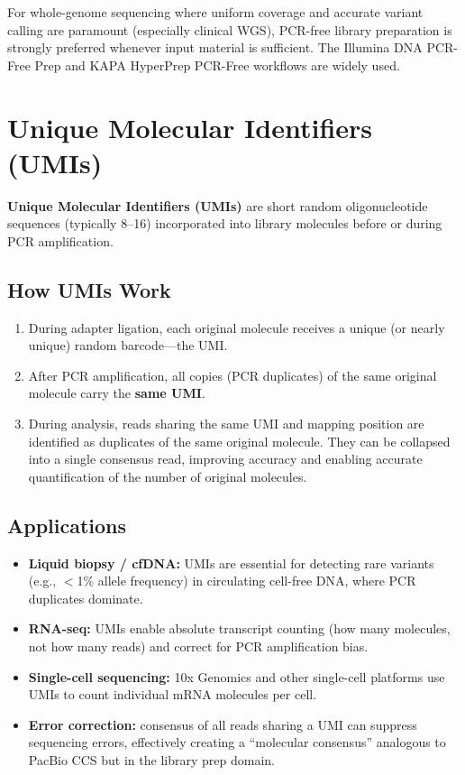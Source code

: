 \begin{tipbox}[title={When to Go PCR-Free}]
For whole-genome sequencing where uniform coverage and accurate variant calling are paramount (especially clinical WGS), PCR-free library preparation is strongly preferred whenever input material is sufficient. The Illumina DNA PCR-Free Prep and KAPA HyperPrep PCR-Free workflows are widely used.
\end{tipbox}


\section{Unique Molecular Identifiers (UMIs)}
\label{sec:umis}

\textbf{Unique Molecular Identifiers (UMIs)} are short random oligonucleotide sequences (typically 8--16\basepair) incorporated into library molecules before or during PCR amplification.

\subsection{How UMIs Work}

\begin{enumerate}[nosep]
  \item During adapter ligation, each original molecule receives a unique (or nearly unique) random barcode---the UMI.
  \item After PCR amplification, all copies (PCR duplicates) of the same original molecule carry the \textbf{same UMI}.
  \item During analysis, reads sharing the same UMI and mapping position are identified as duplicates of the same original molecule. They can be collapsed into a single consensus read, improving accuracy and enabling accurate quantification of the number of original molecules.
\end{enumerate}

\subsection{Applications}

\begin{itemize}[nosep]
  \item \textbf{Liquid biopsy / cfDNA:} UMIs are essential for detecting rare variants (e.g., $<$1\% allele frequency) in circulating cell-free DNA, where PCR duplicates dominate.
  \item \textbf{RNA-seq:} UMIs enable absolute transcript counting (how many molecules, not how many reads) and correct for PCR amplification bias.
  \item \textbf{Single-cell sequencing:} 10x Genomics and other single-cell platforms use UMIs to count individual mRNA molecules per cell.
  \item \textbf{Error correction:} consensus of all reads sharing a UMI can suppress sequencing errors, effectively creating a ``molecular consensus'' analogous to PacBio CCS but in the library prep domain.
\end{itemize}


